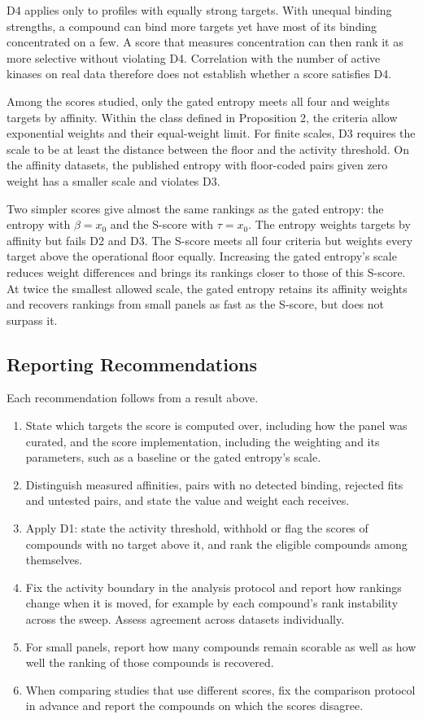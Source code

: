 D4 applies only to profiles with equally strong targets. With unequal binding
strengths, a compound can bind more targets yet have most of its binding
concentrated on a few. A score that measures concentration can then rank it as more
selective without violating D4. Correlation with the number of active kinases
on real data therefore does not establish whether a score satisfies D4.

Among the scores studied, only the gated
entropy meets all four and weights targets by affinity. Within the class
defined in Proposition 2, the criteria allow exponential weights and their
equal-weight limit. For finite scales, D3 requires the scale to be at least
the distance between the floor and the activity threshold. On the affinity
datasets, the published entropy with floor-coded pairs given zero weight has
a smaller scale and violates D3.

Two simpler scores give almost the same rankings as the gated entropy: the
entropy with $\beta = x_0$ and the S-score with $\tau = x_0$. The entropy
weights targets by affinity but fails D2 and D3. The S-score meets all four
criteria but weights every target above the operational floor equally. Increasing the gated
entropy's scale reduces weight differences and brings its rankings closer
to those of this S-score. At twice the smallest allowed scale, the gated
entropy retains its affinity weights and recovers rankings from small panels
as fast as the S-score, but does not surpass it.

\subsection{Reporting Recommendations}

Each recommendation follows from a result above.
\begin{enumerate}
  \item State which targets the score is computed over, including how the
        panel was curated, and the score implementation, including the
        weighting and its parameters, such as a baseline or the gated
        entropy's scale.
  \item Distinguish measured affinities, pairs with no detected binding,
        rejected fits and untested pairs, and state the value and weight each
        receives.
  \item Apply D1: state the activity threshold, withhold or flag the scores of
        compounds with no target above it, and rank the eligible compounds
        among themselves. 
  \item Fix the activity boundary in the analysis protocol and report how
        rankings change when it is moved, for example by each compound's rank
        instability across the sweep. Assess agreement across datasets
        individually.
  \item For small panels, report how many compounds remain scorable as well as
        how well the ranking of those compounds is recovered.
  \item When comparing studies that use different scores, fix the comparison
        protocol in advance and report the compounds on which the scores
        disagree.
\end{enumerate}


